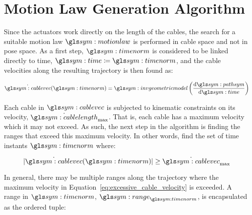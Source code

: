\section{Motion Law Generation Algorithm}%
\label{sec:motion_law_generation_algorithm}

	Since the actuators work directly on the length of the cables, the
	search for a suitable motion law $\motionlaw$ is performed in cable
	space and not in pose space. As a first step, $\timenorm$ is considered
	to be linked directly to time, $\timesym \defeq \timenorm$, and the
	cable velocities along the resulting trajectory is then found as:

	\begin{equation}
		\dot{\cablevec}(\timenorm) =
			\invgeometricmodel
			\left(
				\frac
				{%
					\der\pathsym
				}
				{%
					\der\timesym
				}
			\right)
	\end{equation}

	Each cable in $\cablevec$ is subjected to kinematic constraints on its
	velocity, $\dot\cablelength_{\max}$.  That is, each cable has a maximum
	velocity which it may not exceed. As such, the next step in the algorithm is
	finding the ranges that exceed this maximum velocity. In other words, find
	the set of time instants $\timenorm$ where:

	\begin{equation}
		\abs{\dot{\cablevec}(\timenorm)} \geq \dot{\cablevec}_{\max}
		\label{eq:excessive_cable_velocity}
	\end{equation}

	In general, there may be multiple ranges along the trajectory where the
	maximum velocity in Equation~\ref{eq:excessive_cable_velocity} is
	exceeded. A range in $\timenorm$, $\rangetimenorm$, is encapsulated as
	the ordered tuple:






